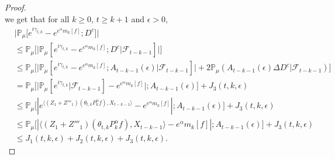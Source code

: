\documentclass[12pt,a4paper]{amsart}
\theoremstyle{plain}
\theoremstyle{definition}
\numberwithin{equation}{section}
\begin{document}
\begin{proof}
\[\]
    we get that for all $k\geq 0$, $t\geq k+1$ and $\epsilon> 0$,
\begin{align}
\label{eq: inequality that will used later}
    &\big|\mathbb{P}_{\mu}\big[e^{i\gamma_{t,k}}-e^{e^{\alpha}m_k[f]}; D^c\big]\big|
    \\& \leq \mathbb{P}_{\mu}\Big[\big| \mathbb{P}_{\mu}[e^{i\gamma_{t,k}}-e^{e^{\alpha}m_k[f]}; D^c | \mathscr F_{t-k-1}]\big|\Big]
    \\& \leq \mathbb{P}_{\mu}\Big[\big| \mathbb{P}_{\mu}[e^{i\gamma_{t,k}}-e^{e^{\alpha}m_k[f]}; A_{t-k-1}(\epsilon)| \mathscr F_{t-k-1}]\big| + 2\mathbb P_\mu(A_{t-k-1}(\epsilon) \Delta D^c| \mathscr F_{t-k-1})\Big]
    \\& = \mathbb{P}_{\mu}\Big[ \big|\mathbb{P}_{\mu}[e^{i\gamma_{t,k}}| \mathscr F_{t-k-1}]-e^{e^{\alpha}m_k[f]}\big|;A_{t-k-1}(\epsilon)\Big] + J_3(t,k,\epsilon)
    \\& \leq \mathbb{P}_{\mu}\big[|e^{\langle (Z_1+Z'''_1) (\theta_{t,k}P^\alpha_k f),X_{t-k-1}\rangle}-e^{e^{\alpha}m_k[f]}|;A_{t-k-1}(\epsilon)\big]+  J_3(t,k,\epsilon)
    \\& \leq \mathbb{P}_{\mu}\big[|\langle (Z_1+Z'''_1)(\theta_{t,k}P^\alpha_k f),X_{t-k-1}\rangle-e^{\alpha}m_k[f]|;A_{t-k-1}(\epsilon)\big]+  J_3(t,k,\epsilon)
    \\&\leq J_1(t,k,\epsilon) + J_2(t,k,\epsilon)+J_3(t,k,\epsilon).
\end{align}


\end{proof}
\end{document}
